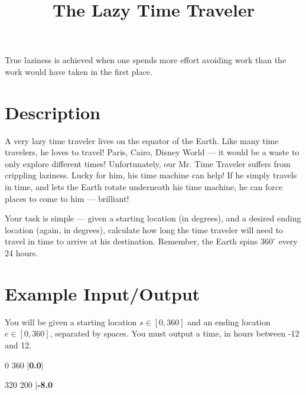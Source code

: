 \documentclass{../codeproblem}
\begin{document}
\title{The Lazy Time Traveler}

\begin{flavor}
  True laziness is achieved when one spends more effort avoiding work
  than the work would have taken in the first place.
\end{flavor}

\section*{Description}
A very lazy time traveler lives on the equator of the Earth. Like many
time travelers, he loves to travel! Paris, Cairo, Disney World --- it
would be a waste to only explore different times! Unfortunately,
our Mr. Time Traveler suffers from crippling laziness. Lucky for him, his
time machine can help! If he simply travels in time, and lets the
Earth rotate underneath his time machine, he can force places to come
to him --- brilliant!

Your task is simple --- given a starting location (in degrees), and a
desired ending location (again, in degrees), calculate how long the
time traveler will need to travel in time to arrive at his
destination. Remember, the Earth spins $360^\circ$ every 24 hours.

\section*{Example Input/Output}

You will be given a starting location $s \in [0, 360]$ and an ending
location $e \in [0, 360]$, separated by spaces. You must
output a time, in hours between -12 and 12.

\begin{example}
0 360
|\textbf{0.0}|

320 200
|\textbf{-8.0}\end{example}
\end{document}
